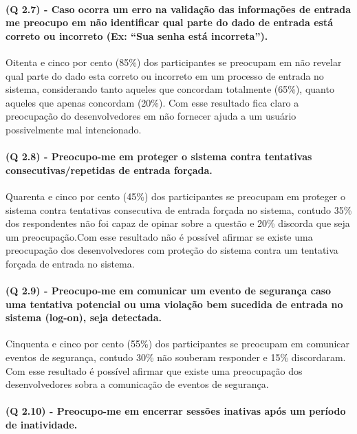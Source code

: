 \paragraph{\textbf{(Q 2.7)} - Caso ocorra um erro na validação das informações de entrada me preocupo em não identificar qual parte do dado de entrada está correto ou incorreto (Ex: “Sua senha está incorreta”).}

Oitenta e cinco por cento (85{\%}) dos participantes se preocupam em não revelar qual parte do dado esta correto ou incorreto em um processo de entrada no sistema, considerando tanto aqueles que concordam totalmente (65{\%}), quanto aqueles que apenas concordam (20{\%}). Com esse resultado fica claro a preocupação do desenvolvedores em não fornecer ajuda a um usuário possivelmente mal intencionado.

\paragraph{\textbf{(Q 2.8)} - Preocupo-me em proteger o sistema contra tentativas consecutivas/repetidas de entrada forçada.}

Quarenta e cinco por cento (45{\%}) dos participantes se preocupam em proteger o sistema contra tentativas consecutiva de entrada forçada no sistema, contudo 35{\%} dos respondentes não foi capaz de opinar sobre a questão e 20{\%} discorda que seja um preocupação.Com esse resultado não é possível afirmar se existe uma preocupação dos desenvolvedores com proteção do sistema contra um tentativa forçada de entrada no sistema.

\paragraph{\textbf{(Q 2.9)} - Preocupo-me em comunicar um evento de segurança caso uma tentativa potencial ou uma violação bem sucedida de entrada no sistema (log-on), seja detectada.}

Cinquenta e cinco por cento (55{\%}) dos participantes se preocupam em comunicar eventos de segurança, contudo 30{\%} não souberam responder e 15{\%} discordaram. Com esse resultado é possível afirmar que existe uma preocupação dos desenvolvedores sobra a comunicação de eventos de segurança.

\paragraph{\textbf{(Q 2.10)} - Preocupo-me em encerrar sessões inativas após um período de inatividade.}

